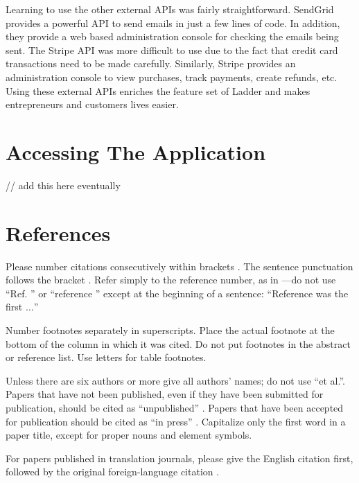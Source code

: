 \documentclass[conference]{IEEEtran}
\begin{document}
Learning to use the other external APIs was fairly straightforward. SendGrid provides a powerful API to send emails in just a few lines of code. In addition, they provide a web based administration console for checking the emails being sent. The Stripe API was more difficult to use due to the fact that credit card transactions need to be made carefully. Similarly, Stripe provides an administration console to view purchases, track payments, create refunds, etc. Using these external APIs enriches the feature set of Ladder and makes entrepreneurs and customers lives easier.

\section{Accessing The Application}
// add this here eventually
\section*{References}

Please number citations consecutively within brackets \cite{b1}. The 
sentence punctuation follows the bracket \cite{b2}. Refer simply to the reference 
number, as in \cite{b3}---do not use ``Ref. \cite{b3}'' or ``reference \cite{b3}'' except at 
the beginning of a sentence: ``Reference \cite{b3} was the first $\ldots$''

Number footnotes separately in superscripts. Place the actual footnote at 
the bottom of the column in which it was cited. Do not put footnotes in the 
abstract or reference list. Use letters for table footnotes.

Unless there are six authors or more give all authors' names; do not use 
``et al.''. Papers that have not been published, even if they have been 
submitted for publication, should be cited as ``unpublished'' \cite{b4}. Papers 
that have been accepted for publication should be cited as ``in press'' \cite{b5}. 
Capitalize only the first word in a paper title, except for proper nouns and 
element symbols.

For papers published in translation journals, please give the English 
citation first, followed by the original foreign-language citation \cite{b6}.
\end{document}
